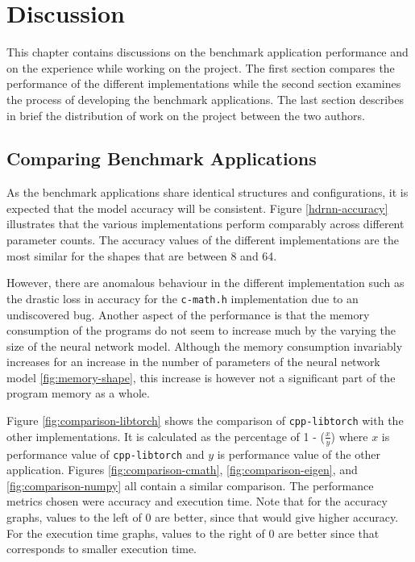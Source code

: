 
\chapter{Discussion}

This chapter contains discussions on the benchmark application performance and on the experience while working on the project. The first section compares the performance of the different implementations while the second section examines the process of developing the benchmark applications. The last section describes in brief the distribution of work on the project between the two authors.

\section{Comparing Benchmark Applications}

As the benchmark applications share identical structures and configurations, it is expected that the model accuracy will be consistent. Figure \ref{hdrnn-accuracy} illustrates that the various implementations perform comparably across different parameter counts. The accuracy values of the different implementations are the most similar for the shapes that are between 8 and 64.

However, there are anomalous behaviour in the different implementation such as the drastic loss in accuracy for the \texttt{c-math.h} implementation due to an undiscovered bug. Another aspect of the performance is that the memory consumption of the programs do not seem to increase much by the varying the size of the neural network model. Although the memory consumption invariably increases for an increase in the number of parameters of the neural network model \ref{fig:memory-shape}, this increase is however not a significant part of the program memory as a whole.

Figure \ref{fig:comparison-libtorch} shows the comparison of \texttt{cpp-libtorch} with the other implementations. It is calculated as the percentage of 1 - ($\frac{x}{y}$) where $x$ is performance value of \texttt{cpp-libtorch} and $y$ is performance value of the other application. Figures \ref{fig:comparison-cmath}, \ref{fig:comparison-eigen}, and \ref{fig:comparison-numpy} all contain a similar comparison. The performance metrics chosen were accuracy and execution time. Note that for the accuracy graphs, values to the left of 0 are better, since that would give higher accuracy. For the execution time graphs, values to the right of 0 are better since that corresponds to smaller execution time.

